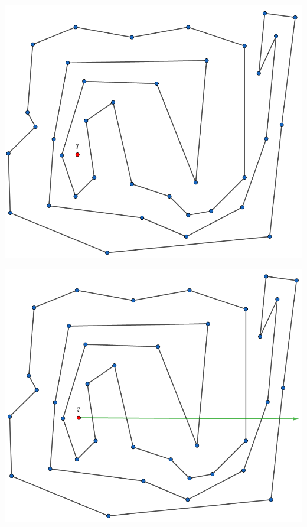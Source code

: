 \begin{frame}
  \centering \includegraphics[width=0.45 \paperwidth]{images/Poda/2.png}
\end{frame}

\begin{frame}
  \centering \includegraphics[width=0.45 \paperwidth]{images/Poda/3.png}
\end{frame}

